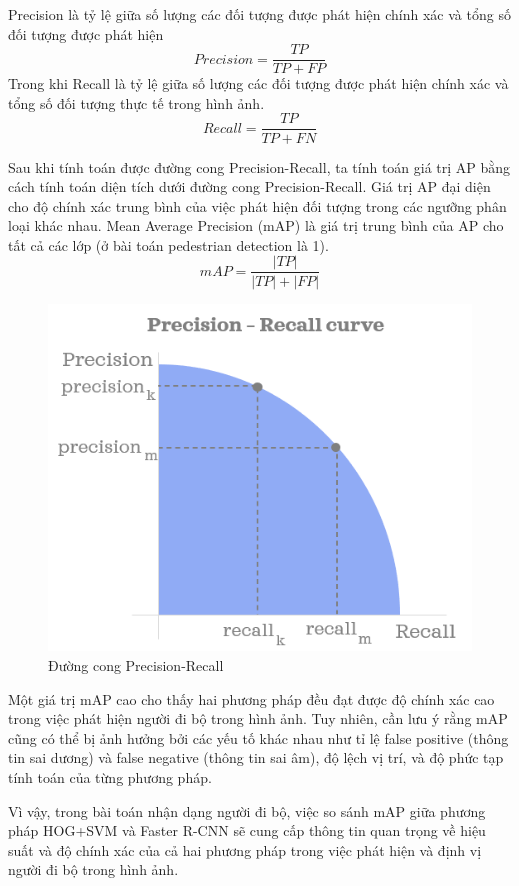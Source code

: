 Precision là tỷ lệ giữa số lượng các đối tượng được phát hiện chính xác và tổng số đối tượng được phát hiện
\begin{equation*}
    Precision = \frac{TP}{TP + FP}\nonumber
\end{equation*}
Trong khi Recall là tỷ lệ giữa số lượng các đối tượng được phát hiện chính xác và tổng số đối tượng thực tế trong hình ảnh.
\begin{equation}
    Recall = \frac{TP}{TP + FN}\nonumber
\end{equation}

Sau khi tính toán được đường cong Precision-Recall, ta tính toán giá trị AP bằng cách tính toán diện tích dưới đường cong Precision-Recall. Giá trị AP đại diện cho độ chính xác trung bình của việc phát hiện đối tượng trong các ngưỡng phân loại khác nhau. Mean Average Precision (mAP) là giá trị trung bình của AP cho tất cả các lớp (ở bài toán pedestrian detection là 1).
\begin{equation}
    mAP = \frac{|TP|}{|TP| + |FP|}\nonumber
\end{equation}
\begin{figure}[h!]
  \centering
    \includegraphics[scale=0.5]{graphics/curve.png}
  \caption{Đường cong Precision-Recall}
\end{figure}
Một giá trị mAP cao cho thấy hai phương pháp đều đạt được độ chính xác cao trong việc phát hiện người đi bộ trong hình ảnh. Tuy nhiên, cần lưu ý rằng mAP cũng có thể bị ảnh hưởng bởi các yếu tố khác nhau như tỉ lệ false positive (thông tin sai dương) và false negative (thông tin sai âm), độ lệch vị trí, và độ phức tạp tính toán của từng phương pháp.

Vì vậy, trong bài toán nhận dạng người đi bộ, việc so sánh mAP giữa phương pháp HOG+SVM và Faster R-CNN sẽ cung cấp thông tin quan trọng về hiệu suất và độ chính xác của cả hai phương pháp trong việc phát hiện và định vị người đi bộ trong hình ảnh.
